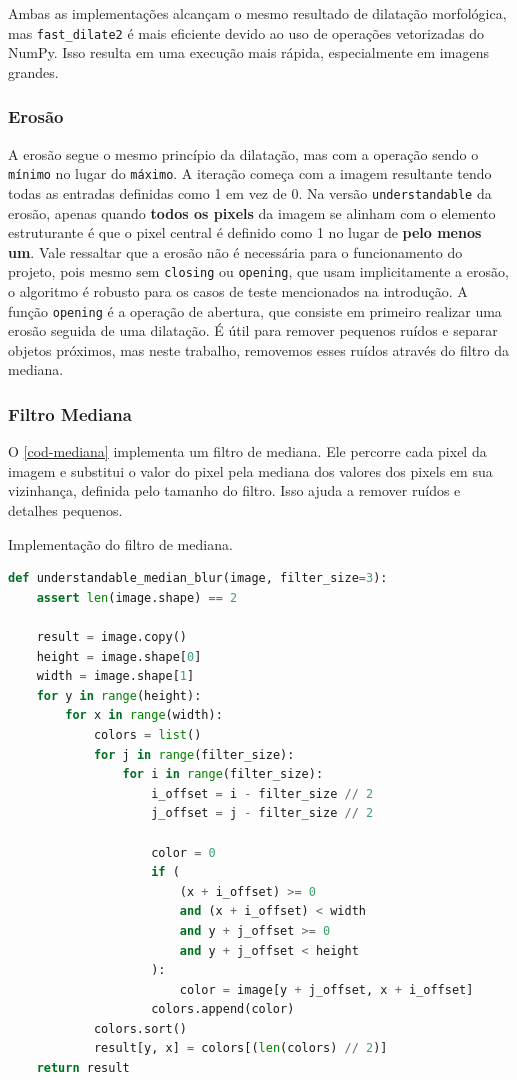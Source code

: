 \documentclass[english, 
               brazil, 
               bsc] %
               {dcomp-abntex2}
\begin{document}
Ambas as implementações alcançam o mesmo resultado de dilatação morfológica, mas \texttt{fast\_dilate2} é mais eficiente devido ao uso de operações vetorizadas do NumPy. Isso resulta em uma execução mais rápida, especialmente em imagens grandes.


\subsubsection{Erosão}

A erosão segue o mesmo princípio da dilatação, mas com a operação sendo o \texttt{mínimo} no lugar do \texttt{máximo}. A iteração começa com a imagem resultante tendo todas as entradas definidas como 1 em vez de 0. Na versão \texttt{understandable} da erosão, apenas quando \textbf{todos os pixels} da imagem se alinham com o elemento estruturante é que o pixel central é definido como 1 no lugar de \textbf{pelo menos um}. Vale ressaltar que a erosão não é necessária para o funcionamento do projeto, pois mesmo sem \texttt{closing} ou \texttt{opening}, que usam implicitamente a erosão, o algoritmo é robusto para os casos de teste mencionados na introdução. A função \texttt{opening} é a operação de abertura, que consiste em primeiro realizar uma erosão seguida de uma dilatação. É útil para remover pequenos ruídos e separar objetos próximos, mas neste trabalho, removemos esses ruídos através do filtro da mediana.


\subsubsection{Filtro Mediana}

O \autoref{cod-mediana} implementa um filtro de mediana. Ele percorre cada pixel da imagem e substitui o valor do pixel pela mediana dos valores dos pixels em sua vizinhança, definida pelo tamanho do filtro. Isso ajuda a remover ruídos e detalhes pequenos.

\begin{codigo}[h]
  \caption{\small Implementação do filtro de mediana.}
 \label{cod-mediana}
\begin{lstlisting}[language=python]
def understandable_median_blur(image, filter_size=3):
    assert len(image.shape) == 2

    result = image.copy()
    height = image.shape[0]
    width = image.shape[1]
    for y in range(height):
        for x in range(width):
            colors = list()
            for j in range(filter_size):
                for i in range(filter_size):
                    i_offset = i - filter_size // 2
                    j_offset = j - filter_size // 2

                    color = 0
                    if (
                        (x + i_offset) >= 0
                        and (x + i_offset) < width
                        and y + j_offset >= 0
                        and y + j_offset < height
                    ):
                        color = image[y + j_offset, x + i_offset]
                    colors.append(color)
            colors.sort()
            result[y, x] = colors[(len(colors) // 2)]
    return result
\end{lstlisting}
\end{codigo}
\end{document}
